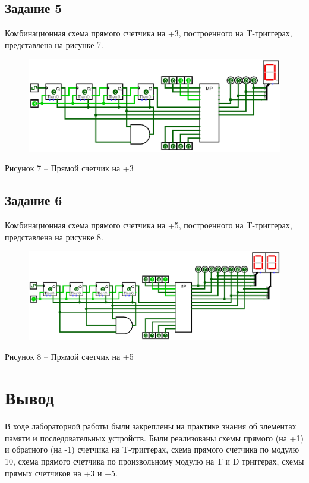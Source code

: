 \documentclass[a4paper,14pt]{extarticle}
\begin{document}
  \subsection*{Задание 5}
  Комбинационная схема прямого счетчика на +3, построенного на T-триггерах, представлена на рисунке 7.
  
  \begin{figure}[h]
    \centering
    \includegraphics[width=0.8\linewidth]{images/s-5}
  \end{figure}
  \begin{center}
    Рисунок 7 – Прямой счетчик на +3
  \end{center}
  
  \pagebreak
  \subsection*{Задание 6}
  Комбинационная схема прямого счетчика на +5, построенного на T-триггерах, представлена на рисунке 8.
  
  \begin{figure}[h]
    \centering
    \includegraphics[width=0.8\linewidth]{images/s-6}
  \end{figure}
  \begin{center}
    Рисунок 8 – Прямой счетчик на +5
  \end{center}
  
  \section*{Вывод}
  В ходе лабораторной работы были закреплены на практике знания об элементах памяти и последовательных устройств. Были реализованы схемы прямого (на +1) и обратного (на -1) счетчика на T-триггерах, схема прямого счетчика по модулю 10, схема прямого счетчика по произвольному модулю на T и D триггерах, схемы прямых счетчиков на +3 и +5.
  
\end{document}

